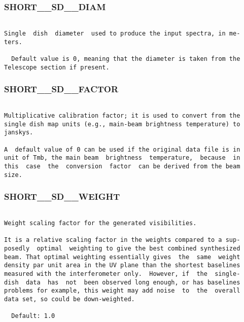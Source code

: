 \subsubsection{SHORT\_\_SD\_\_DIAM}
\begin{verbatim}

Single  dish  diameter  used to produce the input spectra, in me-
ters.

  Default value is 0, meaning that the diameter is taken from the
Telescope section if present.

\end{verbatim}
\subsubsection{SHORT\_\_SD\_\_FACTOR}
\begin{verbatim}

Multiplicative calibration factor; it is used to convert from the
single dish map units (e.g., main-beam brightness temperature) to
janskys.

A  default value of 0 can be used if the original data file is in
unit of Tmb, the main beam  brightness  temperature,  because  in
this  case  the  conversion  factor  can be derived from the beam
size.

\end{verbatim}
\subsubsection{SHORT\_\_SD\_\_WEIGHT}
\begin{verbatim}

Weight scaling factor for the generated visibilities.

It is a relative scaling factor in the weights compared to a sup-
posedly  optimal  weighting to give the best combined synthesized
beam. That optimal weighting essentially gives  the  same  weight
density par unit area in the UV plane than the shortest baselines
measured with the interferometer only.  However, if  the  single-
dish  data  has  not  been observed long enough, or has baselines
problems for example, this weight may add noise  to  the  overall
data set, so could be down-weighted.

  Default: 1.0

\end{verbatim}
